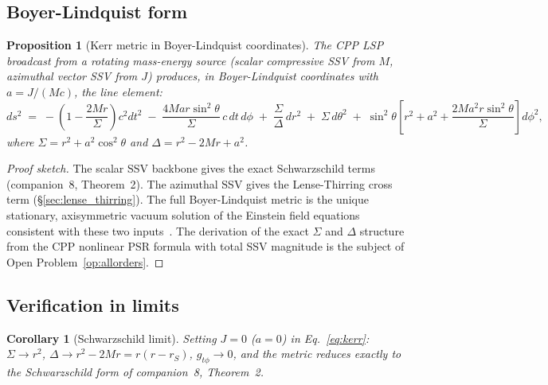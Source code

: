 \documentclass[12pt]{article}
\newtheorem{proposition}[theorem]{Proposition}
\newtheorem{corollary}[theorem]{Corollary}
\newcommand{\rS}{r_S}
\newcommand{\Sig}{\Sigma}
\newcommand{\Dlt}{\Delta}
\begin{document}
\subsection{Boyer-Lindquist form}

\begin{proposition}[Kerr metric in Boyer-Lindquist coordinates]
\label{prop:kerr_full}
The CPP LSP broadcast from a rotating mass-energy source (scalar
compressive SSV from $M$, azimuthal vector SSV from $J$) produces,
in Boyer-Lindquist coordinates with $a = J/(Mc)$, the line element:
\begin{equation}
  \boxed{ds^2 \;=\;
  -\!\left(1-\frac{2Mr}{\Sig}\right)c^2dt^2
  \;-\; \frac{4Mar\sin^2\!\theta}{\Sig}\,c\,dt\,d\phi
  \;+\; \frac{\Sig}{\Dlt}\,dr^2
  \;+\; \Sig\,d\theta^2
  \;+\; \sin^2\!\theta\!\left[r^2+a^2+
  \frac{2Ma^2r\sin^2\!\theta}{\Sig}\right]d\phi^2,}
  \label{eq:kerr}
\end{equation}
where $\Sig = r^2 + a^2\cos^2\theta$ and $\Dlt = r^2 - 2Mr + a^2$.
\end{proposition}

\begin{proof}[Proof sketch]
The scalar SSV backbone gives the exact Schwarzschild terms
(companion~8, Theorem~2).  The azimuthal SSV gives the Lense-Thirring
cross term (§\ref{sec:lense_thirring}).  The full Boyer-Lindquist
metric is the unique stationary, axisymmetric vacuum solution of the
Einstein field equations consistent with these two inputs~\cite{kerr1963,
wald1984}.  The derivation of the exact $\Sig$ and $\Dlt$ structure
from the CPP nonlinear PSR formula with total SSV magnitude is
the subject of Open Problem~\ref{op:allorders}.
\end{proof}

\subsection{Verification in limits}

\begin{corollary}[Schwarzschild limit]
\label{cor:schwarz_limit}
Setting $J = 0$ ($a = 0$) in Eq.~\eqref{eq:kerr}:
$\Sig \to r^2$, $\Dlt \to r^2 - 2Mr = r(r-\rS)$, $g_{t\phi} \to 0$,
and the metric reduces exactly to the Schwarzschild form of companion~8,
Theorem~2.
\end{corollary}
\end{document}
